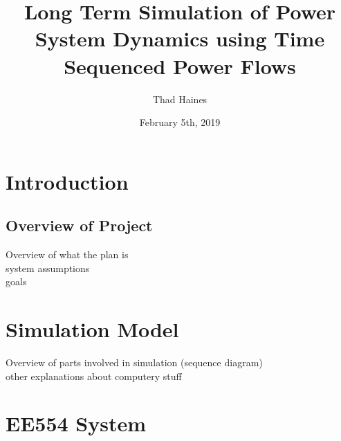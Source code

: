 \documentclass[14pt, unknownkeysallowed]{beamer}
\title{Long Term Simulation of Power System Dynamics using Time Sequenced Power Flows}
\author{Thad Haines}
\institute[MT TECH]{Montana Tech - Master's Thesis Research Project}
\date{February 5th, 2019}
\begin{document}
\begin{frame}
\titlepage
\end{frame}

\section{Introduction}
\subsection{Overview of Project}
\begin{frame}
Overview of what the plan is \\
system assumptions\\
goals
\end{frame}

\section{Simulation Model}
\begin{frame}
Overview of parts involved in simulation (sequence diagram)\\
other explanations about computery stuff
\end{frame}

\section{EE554 System}
\end{document}
